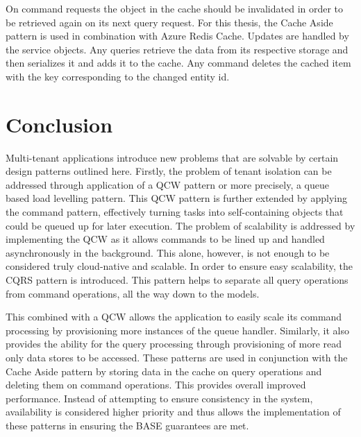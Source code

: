  
On command requests the object in the cache should be invalidated in order to be retrieved again on its next query request. For this thesis, the Cache Aside pattern is used in combination with Azure Redis Cache. Updates are handled by the service objects. Any queries retrieve the data from its respective storage and then serializes it and adds it to the cache. Any command deletes the cached item with the key corresponding to the changed entity id.


\section{Conclusion}
 
Multi-tenant applications introduce new problems that are solvable by certain design patterns outlined here. Firstly, the problem of tenant isolation can be addressed through application of a QCW pattern or more precisely, a queue based load levelling pattern. This QCW pattern is further extended by applying the command pattern, effectively turning tasks into self-containing objects that could be queued up for later execution. The problem of scalability is addressed by implementing the QCW as it allows commands to be lined up and handled asynchronously in the background. This alone, however, is not enough to be considered truly cloud-native and scalable. In order to ensure easy scalability, the CQRS pattern is introduced. This pattern helps to separate all query operations from command operations, all the way down to the models.
 
This combined with a QCW allows the application to easily scale its command processing by provisioning more instances of the queue handler. Similarly, it also provides the ability for the query processing through provisioning of more read only data stores to be accessed. These patterns are used in conjunction with the Cache Aside pattern by storing data in the cache on query operations and deleting them on command operations. This provides overall improved performance. Instead of attempting to ensure consistency in the system, availability is considered higher priority and thus allows the implementation of these patterns in ensuring the BASE guarantees are met.